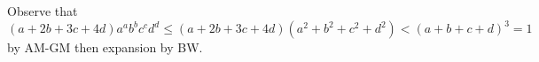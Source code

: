 Observe that
\[
	(a+2b+3c+4d)a^ab^bc^cd^d\leq(a+2b+3c+4d)(a^2+b^2+c^2+d^2)<(a+b+c+d)^3=1
\]
by AM-GM then expansion by BW.
